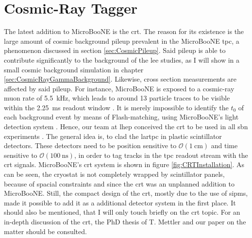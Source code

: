 \section{Cosmic-Ray Tagger} \label{sec:CRT}
The latest addition to MicroBooNE is the \gls{crt}. The reason for its existence is the large amount of cosmic background pileup prevalent in the MicroBooNE \gls{tpc}, a phenomenon discussed in section \ref{sec:CosmicPileup}. Said pileup is able to contribute significantly to the background of the \gls{lee} studies, as I will show in a small cosmic background simulation in chapter \ref{sec:CosmicRayGammaBackground}. Likewise, cross section measurements are affected by said pileup. For instance, MicroBooNE is exposed to a cosmic-ray muon rate of \SI{5.5}{\kilo\hertz}, which leads to around \num{13} particle traces to be visible within the \SI{2.25}{\milli\second} readout window \cite{MicroBooNEMuonRate}. It is merely impossible to identify the $t_0$ of each background event by means of \gls{Flash}-matching, using MicroBooNE's light detection system \cite{MicroBooNEFlashMatching}. Hence, our team at \gls{lhep} conceived the \gls{crt} to be used in all \gls{sbn} experiments \cite{CRTGeneral}. The general idea is, to clad the \gls{lartpc} in plastic scintillator detectors. These detectors need to be position sensitive to $\mathcal{O}(\SI{1}{\centi\metre})$ and time sensitive to $\mathcal{O}(\SI{100}{\nano\second})$, in order to tag tracks in the \gls{tpc} readout stream with the \gls{crt} signals. MicroBooNE's \gls{crt} system is shown in figure \ref{fig:CRTInstallation}. As can be seen, the cryostat is not completely wrapped by scintillator panels, because of spacial constraints and since the \gls{crt} was an unplanned addition to MicroBooNE. Still, the compact design of the \gls{crt}, mostly due to the use of \glspl{sipm}, made it possible to add it as a additional detector system in the first place. It should also be mentioned, that I will only touch briefly on the \gls{crt} topic. For an in-depth discussion of the \gls{crt}, the PhD thesis of T. Mettler \cite{CRTThomasPhD} and our paper on the matter \cite{CRTGeneral} should be consulted.
